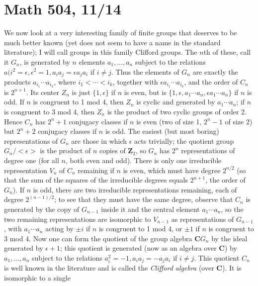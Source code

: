 \documentclass[10pt]{article}
\begin{document}
\section*{Math 504, 11/14}

We now look at a very interesting family of finite groups that deserves
to be much better known (yet does not seem to have a name in the
standard literature); I will call groups in this family Clifford groups.
The $n$th of these, call it $G_n$, is generated by $n$ elements
$a_1,\ldots,a_n$ subject to the relations $a(i^2 = \epsilon,\epsilon^2 =
1, a_i a_j = \epsilon a_j a_i$ if $i\ne j$. Thus the elements of $G_n$
are exactly the products $a_{i_1}\cdots a_{i_k}$, where $i_1 < \cdots <
i_k$, together with $\epsilon a_{i_1}\cdots a_{i_k}$, and the order of
$C_n$ is $2^{n+1}$. Its center $Z_n$ is just $\{1,\epsilon\}$ if $n$ is
even, but is $\{1,\epsilon,a_1\cdots a_n,\epsilon a_1\cdots a_n\}$ if
$n$ is odd. If $n$ is congruent to 1 mod 4, then $Z_n$ is cyclic and
generated by $a_1\cdots a_n$; if $n$ is congruent to 3 mod 4, then $Z_n$
is the product of two cyclic groups of order 2. Hence $C_n$ has $2^n +
1$ conjugacy classes if $n$ is even (two of size 1, $2^n - 1$ of size 2)
but $2^n + 2$ conjugacy classes if $n$ is odd. The easiest (but most
boring) representations of $G_n$ are those in which $\epsilon$ acts
trivially; the quotient group $G_n/<\epsilon>$ is the product of $n$
copies of $\mathbf Z_2$, so $G_n$ has $2^n$ representations of degree
one (for all $n$, both even and odd). There is only one irreducible
representation $V_n$ of $C_n$ remaining if $n$ is even, which must have
degree $2^{n/2}$ (so that the sum of the squares of the irreducible
degrees equals $2^{n+1}$, the order of $G_n$). If $n$ is odd, there are
two irreducible representations remaining, each of degree $2^{(n-1)/2}$;
to see that they must have the same degree, observe that $C_n$ is
generated by the copy of $G_{n-1}$ inside it and the central element
$a_1\cdots a_n$, so the two remaining representations are isomorphic to
$V_{n-1}$ as representations of $G_{n-1}$, with $a_1\cdots a_n$ acting
by $\pm i$ if $n$ is congruent to 1 mod 4, or $\pm 1$ if $n$ is
congruent to 3 mod 4. Now one can form the quotient of the group algebra
$\mathbf C G_n$ by the ideal generated by $\epsilon+1$; this quotient is
generated (now as an algebra over $\mathbf C$) by $a_1,\ldots,a_n$
subject to the relations $a_i^2 = -1, a_i a_j = - a_j a_i$ if $i\ne j$.
This quotient $C_n$ is well known in the literature and is called the
{\sl Clifford algebra} (over $\mathbf C$). It is isomorphic to a single
\end{document}
